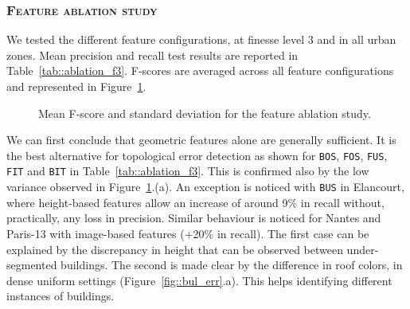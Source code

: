         \subsubsection{\textsc{Feature ablation study}}
            \label{subsubsec:ablation}
            We tested the different feature configurations, at finesse level 3 and in all urban zones.
            Mean precision and recall test results are reported in Table~\ref{tab::ablation_f3}.
            F-scores are averaged across all feature configurations and represented in Figure~\ref{fig::f_score_ablation_f3}.
            
            \begin{figure}[h]
                \centering
                
                \caption{\label{fig::f_score_ablation_f3} Mean F-score and standard deviation for the feature ablation study.}
            \end{figure}

            We can first conclude that geometric features alone are generally sufficient.
            It is the best alternative for topological error detection as shown for \texttt{BOS}, \texttt{FOS}, \texttt{FUS}, \texttt{FIT} and \texttt{BIT} in Table~\ref{tab::ablation_f3}.
            This is confirmed also by the low variance observed in Figure~\ref{fig::f_score_ablation_f3}.(a).
            An exception is noticed with \texttt{BUS} in Elancourt, where height-based features allow an increase of around 9\% in recall without, practically, any loss in precision.
            Similar behaviour is noticed for Nantes and Paris-13 with image-based features (+20\% in recall).
            The first case can be explained by the discrepancy in height that can be observed between under-segmented buildings.
            The second is made clear by the difference in roof colors, in dense uniform settings (Figure~\ref{fig::bul_err}.a).
            This helps identifying different instances of buildings.

